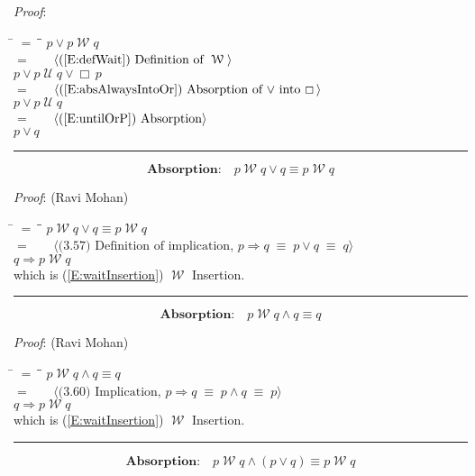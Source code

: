 \documentclass[12pt, fleqn, leqno]{article}
\newcommand{\lgap}{2pt}                             %
\newcommand{\mymathindent}{24pt}                    %
\newcommand{\equivs}{\ensuremath{\;\equiv\;}}       %
\newcommand{\impl}{\ensuremath{\Rightarrow}}        %
\newcommand{\Until}{\;\mathcal{U}\;}
\newcommand{\Wait}{\;\mathcal{W}\;}
\newcommand{\Always}{\Box\,}
\newcommand{\myqed}{\rule[-.23ex]{1.2ex}{2.0ex}}
\newcommand{\myqedtab}{\hspace{384pt}}              %
\newcommand{\Gll} {\langle}                         %
\newcommand{\Ggg} {\rangle}                         %
\newcommand{\Hint}[1]     {\ \ \ $\Gll              \mbox{#1} \Ggg$ }   %
\begin{document}
\emph{Proof}:
\begin{tabbing}
\hspace{\mymathindent} \= $= \;$ \= \myqedtab \= \kill
\> \> $p\lor p\Wait q$\\[\lgap]
\> $=$ \> \Hint{(\ref{E:defWait}) Definition of $\Wait$} \\[\lgap]
\> \> $p\lor p \Until q\lor \Always p$\\[\lgap]
\> $=$ \> \Hint{(\ref{E:absAlwaysIntoOr}) Absorption of $\lor$ into $\Always$} \\[\lgap]
\> \> $p\lor p \Until q$\\[\lgap]
\> $=$ \> \Hint{(\ref{E:untilOrP}) Absorption} \\[\lgap]
\> \> $p\lor q$ \quad \myqed
\end{tabbing}
\begin{equation}\label{E:waitOrQ}
\textbf{Absorption:}\quad p\Wait q\lor q\equiv p\Wait q
\end{equation}

\emph{Proof}: (Ravi Mohan)
\begin{tabbing}
\hspace{\mymathindent} \= $= \;$ \= \myqedtab \= \kill
\> \> $p\Wait q\lor q\equiv p\Wait q$\\[\lgap]
\> $=$ \> \Hint{(3.57) Definition of implication, $p\impl q\equivs p\lor q \equivs q$} \\[\lgap]
\> \> $q\impl p\Wait q$\\[\lgap]
\> which is (\ref{E:waitInsertion}) $\Wait$ Insertion. \quad \myqed
\end{tabbing}
\begin{equation}\label{E:waitAndQ}
\textbf{Absorption:}\quad p\Wait q\land q\equiv q
\end{equation}

\emph{Proof}: (Ravi Mohan)
\begin{tabbing}
\hspace{\mymathindent} \= $= \;$ \= \myqedtab \= \kill
\> \> $p\Wait q\land q\equiv q$\\[\lgap]
\> $=$  \>  \Hint{(3.60) Implication, $p\impl q \equivs p\land q \equivs p$}\\[\lgap]
\> \> $q\impl p\Wait q$\\[\lgap]
\> which is (\ref{E:waitInsertion}) $\Wait$ Insertion. \quad \myqed
\end{tabbing}
\begin{equation}\label{E:waitAndOr}
\textbf{Absorption:}\quad p\Wait q\land (p\lor q) \equiv p\Wait q
\end{equation}
\end{document}
